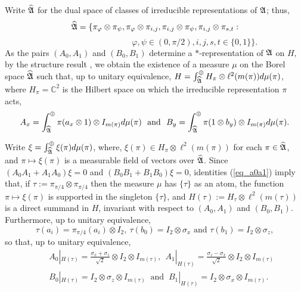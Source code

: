 \documentclass[11pt]{amsart}
\theoremstyle{definition}
\newcommand{\bb}[1]{\mathbb{#1}}
\begin{document}
Write $\widehat {\frak A}$ for the dual space of classes of irreducible representations of $\frak A$; thus, 
$$\widehat{\frak A} = 
\{\pi_{\varphi}\otimes\pi_{\psi}, \pi_{\varphi}\otimes\pi_{i,j}, \pi_{i,j}\otimes\pi_{\psi}, \pi_{i,j}\otimes\pi_{s,t} : $$ 
$$ \hspace{4cm} \varphi,\psi\in(0,\pi/2), i,j,s,t\in\{0,1\}\}.$$
As the pairs $(A_0,A_1)$ and $(B_0,B_1)$ determine a 
$*$-representation of $\frak A$ on $H$, by the structure result 
\cite[Theorem 8.6.6]{dixmier},
we obtain the existence of a measure $\mu$ on the 
Borel space $\widehat{\frak A}$ such that, up to unitary equivalence, 
$H=\int_{\widehat{\frak A}}^\oplus H_\pi\otimes \ell^2(m(\pi))d\mu(\pi)$, 
where $H_{\pi} = \bb{C}^2$ is the Hilbert space on which 
the irreducible representation $\pi$ acts, 
$$A_x=\int_{\widehat{\frak A}}^\oplus\pi(a_x\otimes 1)\otimes I_{m(\pi)}d\mu(\pi)
\ \mbox{ and } \ B_y=\int_{\widehat{\frak A}}^\oplus\pi(1\otimes b_y)\otimes I_{m(\pi)}d\mu(\pi).$$

Write $\xi=\int_{\widehat{\frak A}}^\oplus\xi(\pi)d\mu(\pi)$, where, 
$\xi(\pi)\in H_\pi\otimes\ell^2(m(\pi))$ for each $\pi\in \widehat{\frak A}$, and
$\pi\mapsto \xi(\pi)$ is a measurable field of vectors over 
$\widehat{\frak A}$.
Since $(A_0A_1+A_1A_0)\xi=0$  and  $(B_0B_1+B_1B_0)\xi=0$, 
identities (\ref{eq_a0a1}) imply that, if 
$\tau:=\pi_{\pi/4}\otimes\pi_{\pi/4}$ then 
the measure $\mu$ has $\{\tau\}$ as an atom, 
the function 
$\pi\mapsto \xi(\pi)$ is supported in the singleton
$\{\tau\}$, and  $H(\tau):=H_\tau\otimes \ell^2(m(\tau))$ is a direct summand in $H$, invariant with respect to $(A_0,A_1)$ and $(B_0,B_1)$. Furthermore, 
up to unitary equivalence, 
$$\tau(a_i) = \pi_{\pi/4}(a_i)\otimes I_2, \ 
\tau(b_0) = I_2\otimes\sigma_x \mbox{ and } 
\tau(b_1) = I_2\otimes\sigma_z,$$ 
so that, up to unitary equivalence, 
\begin{eqnarray*}
&&A_0|_{H(\tau)}= \frac{\sigma_x+\sigma_z}{\sqrt{2}}\otimes I_2\otimes I_{m(\tau)}, \ \ A_1|_{H(\tau)}= \frac{\sigma_z-\sigma_x}{\sqrt{2}}\otimes I_2\otimes I_{m(\tau)}\\
&&B_0|_{H(\tau)}=I_2\otimes\sigma_z\otimes I_{m(\tau)}
\ \mbox{ and } \ B_1|_{H(\tau)}= I_2\otimes\sigma_x\otimes I_{m(\tau)}.
\end{eqnarray*}
\end{document}
